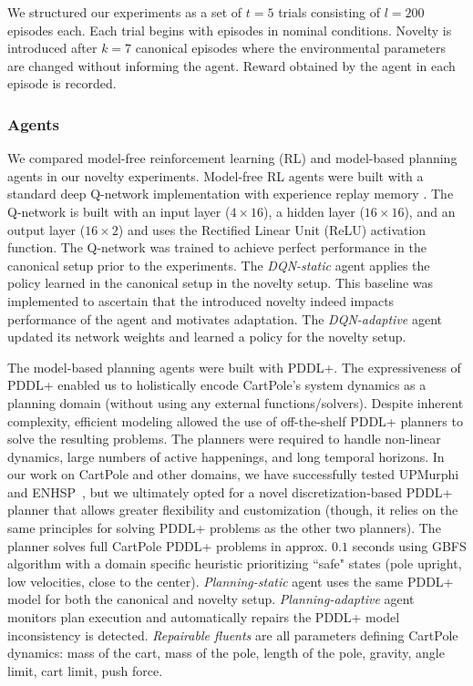 \documentclass[letterpaper]{article} %
\begin{document}
We structured our experiments as a set of $t=5$ trials consisting of $l=200$ episodes each. Each trial begins with episodes in nominal conditions. Novelty is introduced after $k=7$ canonical episodes where the environmental parameters are changed without informing the agent. Reward obtained by the agent in each episode is recorded.

\subsubsection{Agents}
We compared model-free reinforcement learning (RL) and model-based planning agents in our novelty experiments. Model-free RL agents were built with a standard deep Q-network implementation with experience replay memory \cite{mnih2013playing}. The Q-network is built with an input layer ($4 \times 16$), a hidden layer ($16 \times 16$), and an output layer ($16 \times 2$) and uses the Rectified Linear Unit (ReLU) activation function. The Q-network was trained to achieve perfect performance in the canonical setup prior to the experiments. The \emph{DQN-static} agent applies the policy learned in the canonical setup in the novelty setup. This baseline was implemented to ascertain that the introduced novelty indeed impacts performance of the agent and motivates adaptation. The \emph{DQN-adaptive} agent updated its network weights and learned a policy for the novelty setup.

The model-based planning agents were built with PDDL+. The expressiveness of PDDL+ enabled us to holistically encode CartPole's system dynamics as a planning domain (without using any external functions/solvers). Despite inherent complexity, efficient modeling allowed the use of off-the-shelf PDDL+ planners to solve the resulting problems. The planners were required to handle non-linear dynamics, large numbers of active happenings, and long temporal horizons. In our work on CartPole and other domains, we have successfully tested UPMurphi~\cite{della2009upmurphi} and ENHSP~\cite{scala2016interval}, but we ultimately opted for a novel discretization-based PDDL+ planner that allows greater flexibility and customization (though, it relies on the same principles for solving PDDL+ problems as the other two planners). The planner solves full CartPole PDDL+ problems in approx. $0.1$ seconds using GBFS algorithm with a domain specific heuristic prioritizing ``safe" states (pole upright, low velocities, close to the center). \emph{Planning-static} agent uses the same PDDL+ model for both the canonical and novelty setup. \emph{Planning-adaptive} agent monitors plan execution and automatically repairs the PDDL+ model inconsistency is detected. \emph{Repairable fluents} are all parameters defining CartPole dynamics: mass of the cart, mass of the pole, length of the pole, gravity, angle limit, cart limit, push force. 
\end{document}
